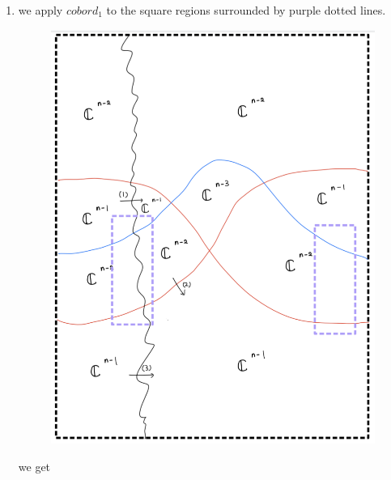 \begin{enumerate}[label=(Step \arabic*)]
\item we apply $cobord_1$ to the square regions surrounded by purple dotted lines.

\begin{figure}[H]
    \centering
    \includegraphics[scale = 0.85]{diagrams/cobord'8/2.png}
    \caption{}
    \label{fig:your-label}
\end{figure}
\pagebreak
we get


\end{enumerate}
